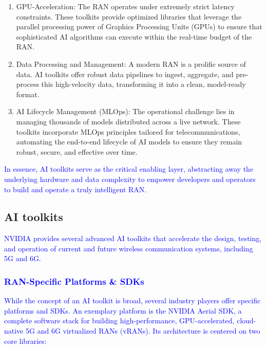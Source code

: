\documentclass[conference]{IEEEtran}
\begin{document}
\begin{enumerate}
\renewcommand\labelitemi{\textcolor{blue}{\textbullet}}
\renewcommand\labelenumi{\textcolor{blue}{\theenumi.}}
\color{blue}
\item GPU-Acceleration: The RAN operates under extremely strict latency constraints. These toolkits provide optimized libraries that leverage the parallel processing power of Graphics Processing Units (GPUs) to ensure that sophisticated AI algorithms can execute within the real-time budget of the RAN.

\item Data Processing and Management: A modern RAN is a prolific source of data. AI toolkits offer robust data pipelines to ingest, aggregate, and pre-process this high-velocity data, transforming it into a clean, model-ready format.

\item AI Lifecycle Management (MLOps): The operational challenge lies in managing thousands of models distributed across a live network. These toolkits incorporate MLOps principles tailored for telecommunications, automating the end-to-end lifecycle of AI models to ensure they remain robust, secure, and effective over time.

\end{enumerate}

\textcolor{blue}{In essence, AI toolkits serve as the critical enabling layer, abstracting away the underlying hardware and data complexity to empower developers and operators to build and operate a truly intelligent RAN.}

\subsection{AI toolkits}\label{AA}

\textcolor{blue}{NVIDIA provides several advanced AI toolkits that accelerate the design, testing, and operation of current and future wireless communication systems, including 5G and 6G.}

\textcolor{blue}{
\subsubsection{RAN-Specific Platforms \& SDKs}
\textcolor{blue}{While the concept of an AI toolkit is broad, several industry players offer specific platforms and SDKs. An exemplary platform is the NVIDIA Aerial SDK, a complete software stack for building high-performance, GPU-accelerated, cloud-native 5G and 6G virtualized RANs (vRANs). Its architecture is centered on two core libraries:}}
\end{document}

